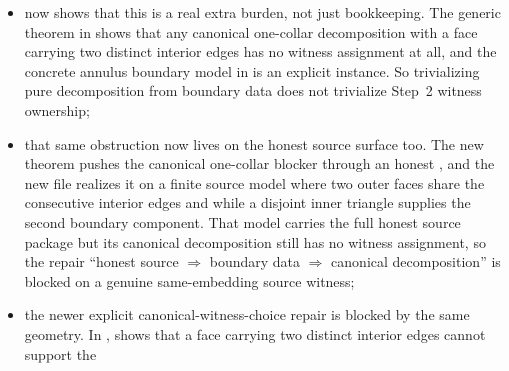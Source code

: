 \documentclass[11pt]{article}
\begin{document}
\begin{itemize}
an open burden on the honest source lane.  In
,
 builds a trivial
one-collar decomposition directly from the annulus boundary split, and
 packages that as
.
So the source shell already reaches pure decomposition; the real remaining
burden is witness-edge ownership and stronger collar geometry, not the naked
existence of collars;
\item {} now shows
that this is a real extra burden, not just bookkeeping.  The generic theorem
in  shows that any canonical
one-collar decomposition with a face carrying two distinct interior edges has
no witness assignment at all, and the concrete annulus boundary model in
 is an explicit
instance.  So trivializing pure decomposition from boundary data does not
trivialize Step~2 witness ownership;
\item that same obstruction now lives on the honest source surface too.  The
new theorem
pushes the canonical one-collar blocker through an honest
, and the new file
 realizes it
on a finite source model where two outer faces share the consecutive interior
edges  and  while a disjoint inner triangle supplies
the second boundary component.  That model carries the full honest source
package but its canonical decomposition still has no witness assignment, so
the repair ``honest source $\Rightarrow$ boundary data $\Rightarrow$ canonical
decomposition'' is blocked on a genuine same-embedding source witness;
\item the newer explicit canonical-witness-choice repair is blocked by the
same geometry.  In ,
shows that a face carrying two distinct interior edges cannot support the

\end{itemize}
\end{document}
